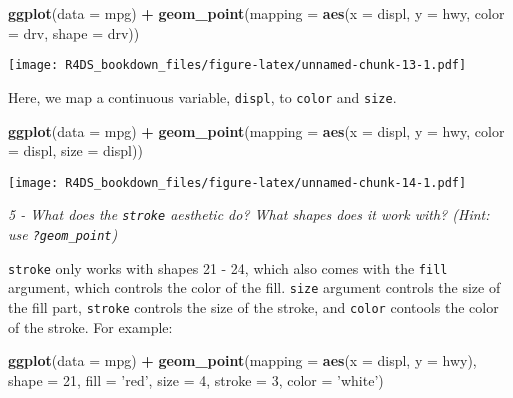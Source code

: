 \documentclass[]{article}
\newenvironment{Shaded}{\begin{snugshade}}{\end{snugshade}}
\newcommand{\KeywordTok}[1]{\textcolor[rgb]{0.13,0.29,0.53}{\textbf{#1}}}
\newcommand{\DataTypeTok}[1]{\textcolor[rgb]{0.13,0.29,0.53}{#1}}
\newcommand{\DecValTok}[1]{\textcolor[rgb]{0.00,0.00,0.81}{#1}}
\newcommand{\StringTok}[1]{\textcolor[rgb]{0.31,0.60,0.02}{#1}}
\newcommand{\OperatorTok}[1]{\textcolor[rgb]{0.81,0.36,0.00}{\textbf{#1}}}
\newcommand{\NormalTok}[1]{#1}
\theoremstyle{definition}
\theoremstyle{definition}
\theoremstyle{definition}
\theoremstyle{remark}
\begin{document}
\begin{Shaded}
\begin{Highlighting}[]
\KeywordTok{ggplot}\NormalTok{(}\DataTypeTok{data =}\NormalTok{ mpg) }\OperatorTok{+}
\StringTok{  }\KeywordTok{geom_point}\NormalTok{(}\DataTypeTok{mapping =} \KeywordTok{aes}\NormalTok{(}\DataTypeTok{x =}\NormalTok{ displ, }\DataTypeTok{y =}\NormalTok{ hwy, }\DataTypeTok{color =}\NormalTok{ drv, }\DataTypeTok{shape =}\NormalTok{ drv))}
\end{Highlighting}
\end{Shaded}

\texttt{[image: R4DS\_bookdown\_files/figure-latex/unnamed-chunk-13-1.pdf]}

Here, we map a continuous variable, \texttt{displ}, to \texttt{color}
and \texttt{size}.

\begin{Shaded}
\begin{Highlighting}[]
\KeywordTok{ggplot}\NormalTok{(}\DataTypeTok{data =}\NormalTok{ mpg) }\OperatorTok{+}
\StringTok{  }\KeywordTok{geom_point}\NormalTok{(}\DataTypeTok{mapping =} \KeywordTok{aes}\NormalTok{(}\DataTypeTok{x =}\NormalTok{ displ, }\DataTypeTok{y =}\NormalTok{ hwy, }\DataTypeTok{color =}\NormalTok{ displ, }\DataTypeTok{size =}\NormalTok{ displ))}
\end{Highlighting}
\end{Shaded}

\texttt{[image: R4DS\_bookdown\_files/figure-latex/unnamed-chunk-14-1.pdf]}

\emph{5 - What does the \texttt{stroke} aesthetic do? What shapes does
it work with? (Hint: use \texttt{?geom\_point})}

\texttt{stroke} only works with shapes 21 - 24, which also comes with
the \texttt{fill} argument, which controls the color of the fill.
\texttt{size} argument controls the size of the fill part,
\texttt{stroke} controls the size of the stroke, and \texttt{color}
contools the color of the stroke. For example:

\begin{Shaded}
\begin{Highlighting}[]
\KeywordTok{ggplot}\NormalTok{(}\DataTypeTok{data =}\NormalTok{ mpg) }\OperatorTok{+}
\StringTok{  }\KeywordTok{geom_point}\NormalTok{(}\DataTypeTok{mapping =} \KeywordTok{aes}\NormalTok{(}\DataTypeTok{x =}\NormalTok{ displ, }\DataTypeTok{y =}\NormalTok{ hwy), }\DataTypeTok{shape =} \DecValTok{21}\NormalTok{,}
             \DataTypeTok{fill =} \StringTok{'red'}\NormalTok{, }\DataTypeTok{size =} \DecValTok{4}\NormalTok{, }\DataTypeTok{stroke =} \DecValTok{3}\NormalTok{, }\DataTypeTok{color =} \StringTok{'white'}\NormalTok{)}
\end{Highlighting}
\end{Shaded}
\end{document}
